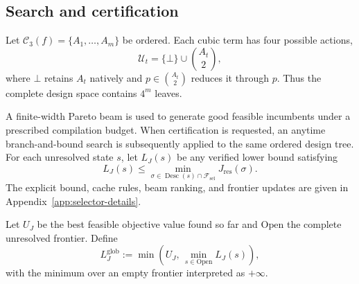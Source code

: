 \documentclass[a4paper,onecolumn,11pt,unpublished]{quantumarticle}
\theoremstyle{remark}
\begin{document}
\subsection{Search and certification}
\label{sec:search-certification}

Let $\mathcal C_3(f)=\{A_1,\ldots,A_m\}$ be ordered. Each cubic term has four
possible actions,
\begin{equation}
\mathcal U_t
=
\{\bot\}\cup\binom{A_t}{2},
\label{eq:action-set}
\end{equation}
where $\bot$ retains $A_t$ natively and $p\in\binom{A_t}{2}$ reduces it
through $p$. Thus the complete design space contains $4^m$ leaves.

A finite-width Pareto beam is used to generate good feasible incumbents under
a prescribed compilation budget. When certification is requested, an
anytime branch-and-bound search is subsequently applied to the same ordered
design tree. For each unresolved state $s$, let $L_J(s)$ be any verified
lower bound satisfying
\begin{equation}
L_J(s)
\le
\min_{\sigma\in\operatorname{Desc}(s)\cap\mathcal F_{\mathrm{sel}}}
J_{\mathrm{res}}(\sigma).
\label{eq:admissible-bound}
\end{equation}
The explicit bound, cache rules, beam ranking, and frontier updates are given
in Appendix~\ref{app:selector-details}.

Let $U_J$ be the best feasible objective value found so far and
$\mathrm{Open}$ the complete unresolved frontier. Define
\begin{equation}
L_J^{\mathrm{glob}}
:=
\min\left(
U_J,\,
\min_{s\in\mathrm{Open}}L_J(s)
\right),
\label{eq:global-lower-bound}
\end{equation}
with the minimum over an empty frontier interpreted as $+\infty$.
\end{document}
